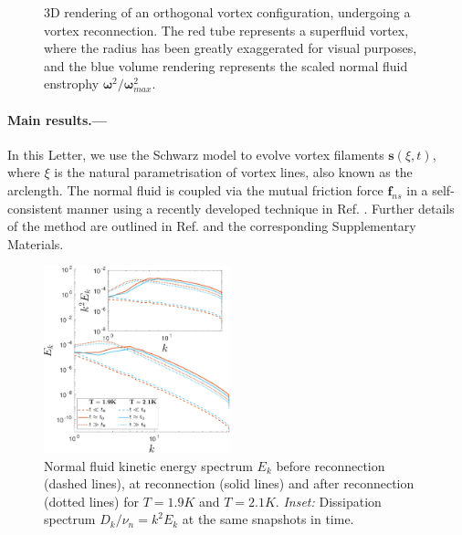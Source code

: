 \documentclass[%
 reprint,
 amsmath,amssymb,
 aps,
 prl,
]{revtex4-2}
\newcommand{\bom}{\boldsymbol{\omega}}
\def \s{\mathbf{s}}
\def\blue#1{\textcolor{blue}{#1}}
\begin{document}
\begin{figure}[t]
\begin{subfigure}[b]{0.24\textwidth}
	\end{subfigure}
    \hfill
	\caption{3D rendering of an orthogonal vortex configuration, undergoing a vortex reconnection. The red tube represents a superfluid vortex, where the radius has been greatly exaggerated for visual purposes, and the blue volume rendering represents the scaled normal fluid enstrophy $\bom^2/\bom^2_{max}$.}
\end{figure}

\blue{
\blindtext[5]
}

\paragraph*{Main results.---} In this Letter, we use the Schwarz model to evolve vortex filaments $\s(\xi,t)$, where $\xi$ is the natural parametrisation of vortex lines, also known as the arclength. The normal fluid is coupled via the mutual friction force $\mathbf{f}_{ns}$ in a self-consistent manner using a recently developed technique in Ref. \cite{galantucciNewSelfconsistentApproach2020b}. Further details of the method are outlined in Ref. \cite{PunctuatedEnergyInjection} and the corresponding Supplementary Materials. 

\begin{figure}[H]
    \centering
    \includegraphics*[width=0.48\textwidth]{energy-spec.pdf}
    \caption{Normal fluid kinetic energy spectrum $E_k$ before reconnection (dashed lines), at reconnection (solid lines) and after reconnection (dotted lines) for $T=1.9K$ and $T=2.1K$. \emph{Inset:} Dissipation spectrum $D_k/\nu_n=k^2 E_k$ at the same snapshots in time.}
\end{figure}
\end{document}
